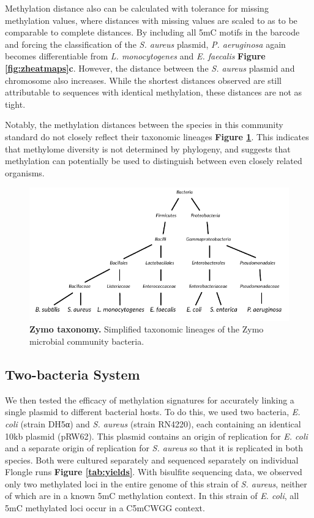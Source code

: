 Methylation distance also can be calculated with tolerance for missing methylation values, where distances with missing values are scaled to as to be comparable to complete distances. By including all 5mC motifs in the barcode and forcing the classification of the \textit{S. aureus} plasmid, \textit{P. aeruginosa} again becomes differentiable from \textit{L. monocytogenes} and \textit{E. faecalis} {\bf Figure \ref{fig:zheatmaps}c}. However, the distance between the \textit{S. aureus} plasmid and chromosome also increases. While the shortest distances observed are still attributable to sequences with identical methylation, these distances are not as tight.

Notably, the methylation distances between the species in this community standard do not closely reflect their taxonomic lineages {\bf Figure \ref{fig:taxonomy}}. This indicates that methylome diversity is not determined by phylogeny, and suggests that methylation can potentially be used to distinguish between even closely related organisms.

\begin{figure}[!hb]
\centering
\includegraphics[width = 1\linewidth,keepaspectratio]{figure/taxonomy.pdf}
\caption[Zymo taxonomy]{{\bf Zymo taxonomy.} Simplified taxonomic lineages of the Zymo microbial community bacteria. }
\label{fig:taxonomy}
\end{figure}


\subsection{Two-bacteria System}
\label{sec:byard}

We then tested the efficacy of methylation signatures for accurately linking a single plasmid to different bacterial hosts. To do this, we used two bacteria, \textit{E. coli} (strain DH5α) and \textit{S. aureus} (strain RN4220), each containing an identical 10kb plasmid (pRW62). This plasmid contains an origin of replication for \textit{E. coli} and a separate origin of replication for \textit{S. aureus} so that it is replicated in both species. Both were cultured separately and sequenced separately on individual Flongle runs {\bf Figure \ref{tab:yields}}. With bisulfite sequencing data, we observed only two methylated loci in the entire genome of this strain of \textit{S. aureus}, neither of which are in a known 5mC methylation context. In this strain of \textit{E. coli}, all 5mC methylated loci occur in a C5mCWGG context.


